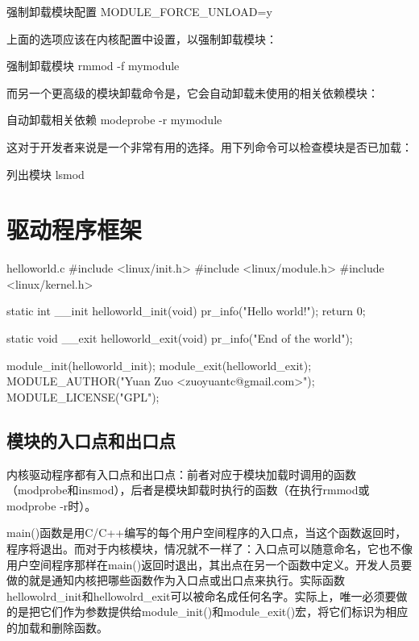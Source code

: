 \documentclass[lang=cn,newtx,10pt,scheme=chinese]{elegantbook}
\begin{document}
\begin{enumerate}
    \begin{mycode}{强制卸载模块配置}
        MODULE_FORCE_UNLOAD=y
    \end{mycode}

    上面的选项应该在内核配置中设置，以强制卸载模块：

    \begin{mycode}{强制卸载模块}
        rmmod -f mymodule
    \end{mycode}

    而另一个更高级的模块卸载命令是，它会自动卸载未使用的相关依赖模块：

    \begin{mycode}{自动卸载相关依赖}
        modeprobe -r mymodule
    \end{mycode}

    这对于开发者来说是一个非常有用的选择。用下列命令可以检查模块是否已加载：

    \begin{mycode}{列出模块}
        lsmod
    \end{mycode}
\end{enumerate}

\section{驱动程序框架}

\begin{mycode}{helloworld.c}
#include <linux/init.h>
#include <linux/module.h>
#include <linux/kernel.h>

static int __init helloworld_init(void) {
    pr_info("Hello world!\n");
    return 0;
}

static void __exit helloworld_exit(void) {
    pr_info("End of the world\n");
}

module_init(helloworld_init);
module_exit(helloworld_exit);
MODULE_AUTHOR("Yuan Zuo <zuoyuantc@gmail.com>");
MODULE_LICENSE("GPL");
\end{mycode}

\subsection{模块的入口点和出口点}

内核驱动程序都有入口点和出口点：前者对应于模块加载时调用的函数（modprobe和insmod），后者是模块卸载时执行的函数（在执行rmmod或modprobe -r时）。

main()函数是用C/C++编写的每个用户空间程序的入口点，当这个函数返回时，程序将退出。而对于内核模块，情况就不一样了：入口点可以随意命名，它也不像用户空间程序那样在main()返回时退出，其出点在另一个函数中定义。开发人员要做的就是通知内核把哪些函数作为入口点或出口点来执行。实际函数hellowolrd\_init和hellowolrd\_exit可以被命名成任何名字。实际上，唯一必须要做的是把它们作为参数提供给module\_init()和module\_exit()宏，将它们标识为相应的加载和删除函数。
\end{document}
